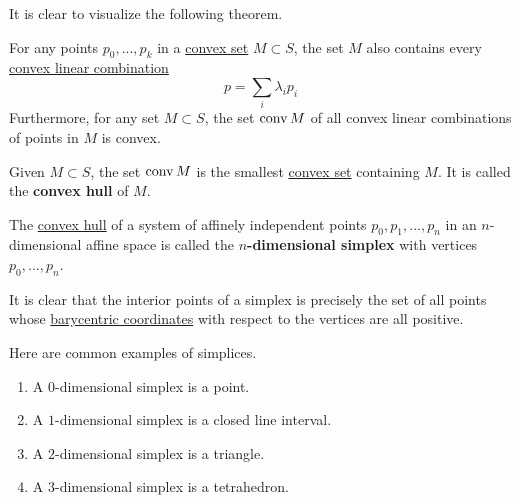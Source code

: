   It is clear to visualize the following theorem. 

  \begin{theorem}
    \label{thm:convex-sets-contain-their-convex-combinations}
    For any points $p_0, ..., p_k$ in a \hyperref[def:convex-set]{convex set} $M \subset S$, the set $M$ also contains every \hyperref[def:convex-linear-combination]{convex linear combination} 
    \begin{equation}
      p = \sum_i \lambda_i p_i
    \end{equation}
    Furthermore, for any set $M \subset S$, the set $\operatorname{conv}{M}$ of all convex linear combinations of points in $M$ is convex. 
  \end{theorem}

  \begin{definition}
    \label{def:convex-hull}
    Given $M \subset S$, the set $\operatorname{conv} M$ is the smallest \hyperref[def:convex-set]{convex set} containing $M$. It is called the \textbf{convex hull} of $M$. 
  \end{definition}

  \begin{definition}
    \label{def:n-dimensional-simplex}
    The \hyperref[def:convex-hull]{convex hull} of a system of affinely independent points $p_0, p_1, ..., p_n$ in an $n$-dimensional affine space is called the \textbf{$n$-dimensional simplex} with vertices $p_0, ..., p_n$. 
  \end{definition}

  It is clear that the interior points of a simplex is precisely the set of all points whose \hyperref[def:barycentric-coordinates]{barycentric coordinates} with respect to the vertices are all positive. 

  \begin{example}
    \label{ex:low-dimensional-simplices}
    Here are common examples of simplices.
    \begin{enumerate}
      \item A $0$-dimensional simplex is a point. 
      \item A $1$-dimensional simplex is a closed line interval. 
      \item A $2$-dimensional simplex is a triangle. 
      \item A $3$-dimensional simplex is a tetrahedron. 
    \end{enumerate}
  \end{example}

